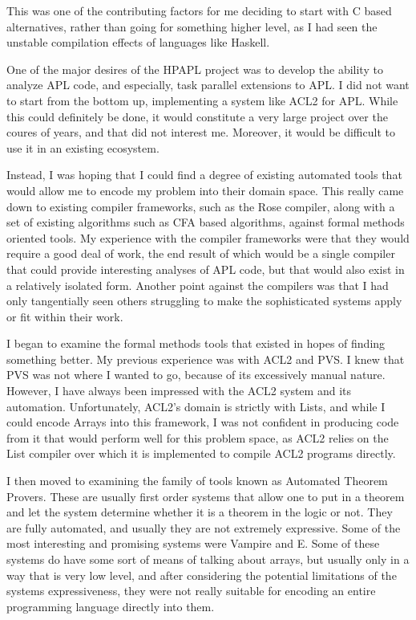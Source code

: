 This was one of the contributing factors for me deciding to start with 
C based alternatives, rather than going for something higher level, as I 
had seen the unstable compilation effects of languages like Haskell.

One of the major desires of the HPAPL project was to develop the ability 
to analyze APL code, and especially, task parallel extensions to APL.
I did not want to start from the bottom up, implementing a system like 
ACL2 for APL. While this could definitely be done, it would constitute 
a very large project over the coures of years, and that did not interest 
me. Moreover, it would be difficult to use it in an existing ecosystem.

Instead, I was hoping that I could find a degree of existing automated 
tools that would allow me to encode my problem into their domain space.
This really came down to existing compiler frameworks, such as the Rose 
compiler, along with a set of existing algorithms such as CFA based 
algorithms, against formal methods oriented tools. My experience with 
the compiler frameworks were that they would require a good deal of 
work, the end result of which would be a single compiler that could 
provide interesting analyses of APL code, but that would also exist in
a relatively isolated form. Another point against the compilers was 
that I had only tangentially seen others struggling to make the 
sophisticated systems apply or fit within their work.

I began to examine the formal methods tools that existed in hopes of 
finding something better. My previous experience was with ACL2 and 
PVS. I knew that PVS was not where I wanted to go, because of its 
excessively manual nature. However, I have always been impressed with 
the ACL2 system and its automation. Unfortunately, ACL2's domain is 
strictly with Lists, and while I could encode Arrays into this framework, 
I was not confident in producing code from it that would perform well 
for this problem space, as ACL2 relies on the List compiler over which 
it is implemented to compile ACL2 programs directly.

I then moved to examining the family of tools known as Automated Theorem
Provers. These are usually first order systems that allow one to put 
in a theorem and let the system determine whether it is a theorem in 
the logic or not. They are fully automated, and usually they are not 
extremely expressive. Some of the most interesting and promising systems 
were Vampire and E. Some of these systems do have some sort of means 
of talking about arrays, but usually only in a way that is very low level, 
and after considering the potential limitations of the systems expressiveness, 
they were not really suitable for encoding an entire programming language 
directly into them.

